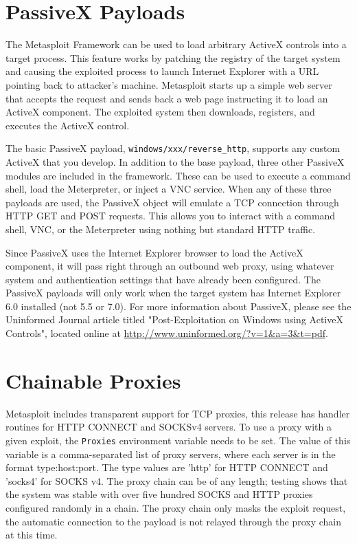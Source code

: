 \documentclass{report}
\begin{document}
\section{PassiveX Payloads}

\par
The Metasploit Framework can be used to load arbitrary ActiveX controls into a
target process. This feature works by patching the registry of the target system
and causing the exploited process to launch Internet Explorer with a URL
pointing back to attacker's machine. Metasploit starts up a simple web server
that accepts the request and sends back a web page instructing it to load an
ActiveX component. The exploited system then downloads, registers, and executes
the ActiveX control.

\par
The basic PassiveX payload, \texttt{windows/xxx/reverse\_http}, supports any
custom ActiveX that you develop. In addition to the base payload, three other
PassiveX modules are included in the framework. These can be used to execute a
command shell, load the Meterpreter, or inject a VNC service. When any of these
three payloads are used, the PassiveX object will emulate a TCP connection
through HTTP GET and POST requests. This allows you to interact with a command
shell, VNC, or the Meterpreter using nothing but standard HTTP traffic.

\par
Since PassiveX uses the Internet Explorer browser to load the ActiveX component,
it will pass right through an outbound web proxy, using whatever system and
authentication settings that have already been configured. The PassiveX payloads
will only work when the target system has Internet Explorer 6.0 installed (not
5.5 or 7.0). For more information about PassiveX, please see the Uninformed
Journal article titled "Post-Exploitation on Windows using ActiveX Controls",
located online at \url{http://www.uninformed.org/?v=1&a=3&t=pdf}.

\section{Chainable Proxies}

\par
Metasploit includes transparent support for TCP proxies, this release has
handler routines for HTTP CONNECT and SOCKSv4 servers. To use a proxy with a
given exploit, the \texttt{Proxies} environment variable needs to be set. The
value of this variable is a comma-separated list of proxy servers, where each
server is in the format type:host:port. The type values are 'http' for HTTP
CONNECT and 'socks4' for SOCKS v4. The proxy chain can be of any length; testing
shows that the system was stable with over five hundred SOCKS and HTTP proxies
configured randomly in a chain. The proxy chain only masks the exploit request,
the automatic connection to the payload is not relayed through the proxy chain
at this time.
\end{document}
